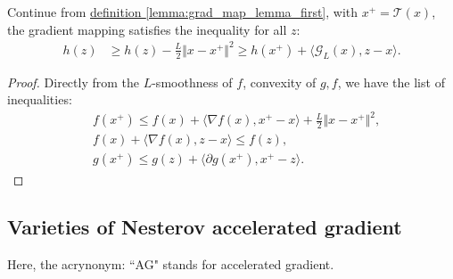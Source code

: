 \documentclass[12pt]{article}
\begin{document}
        \begin{lemma}
            Continue from 
            \hyperref[lemma:grad_map_lemma_first]{definition \ref*{lemma:grad_map_lemma_first}}, 
            with $x^+ = \mathcal T(x)$, the gradient mapping satisfies the inequality for all $z$: 
            \begin{align*}
                h(z) &\ge
                h(z) - \frac{L}{2}\Vert x - x^+\Vert^2
                \ge h(x^+) + \langle \mathcal G_L(x), z - x\rangle. 
            \end{align*}
        \end{lemma}
        \begin{proof}
            Directly from the $L$-smoothness of $f$, convexity of $g, f$, we have the list of inequalities: 
            \begin{align*}
                &f(x^+) \le 
                f(x) + \langle \nabla f(x), x^+ - x\rangle
                + \frac{L}{2}\Vert x - x^+\Vert^2, 
                \\
                &f(x) + \langle \nabla f(x), z - x\rangle 
                \le f(z), 
                \\
                &g(x^+) \le 
                g(z) + \langle \partial g(x^+), x^+ - z\rangle. 
            \end{align*}
        \end{proof}

    \subsection{Varieties of Nesterov accelerated gradient}\label{sec:AG_varieties}
        Here, the acrynonym: ``AG" stands for accelerated gradient. 
\end{document}
